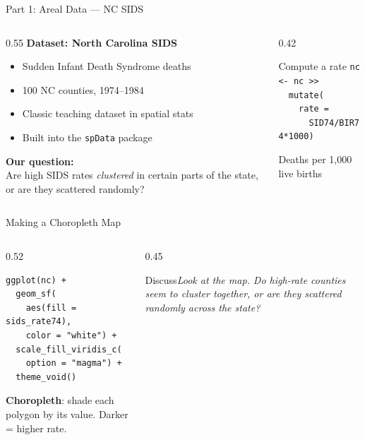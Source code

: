 \documentclass[aspectratio=169, 12pt]{beamer}
\newcommand{\pkg}[1]{\texttt{\color{spataccent}#1}}
\newcommand{\discuss}[1]{\begin{alertblock}{Discuss}\textit{#1}\end{alertblock}}
\begin{document}
\begin{frame}{Part 1: Areal Data --- NC SIDS}
  \begin{columns}[t]
    \begin{column}{0.55\textwidth}
      \textbf{Dataset: North Carolina SIDS}
      \begin{itemize}
        \item Sudden Infant Death Syndrome deaths
        \item 100 NC counties, 1974--1984
        \item Classic teaching dataset in spatial stats
        \item Built into the \pkg{spData} package
      \end{itemize}
      \vspace{0.6em}
      \textbf{Our question:}\\
      Are high SIDS rates \emph{clustered} in certain parts of the state, or are they scattered randomly?
    \end{column}
    \begin{column}{0.42\textwidth}
      \begin{exampleblock}{Compute a rate}
        \texttt{nc <- nc \textbar>\!\!\!>}\\
        \texttt{\ \ mutate(}\\
        \texttt{\ \ \ \ rate =}\\
        \texttt{\ \ \ \ \ \ SID74/BIR74*1000)}
        \vspace{0.3em}

        \small Deaths per 1,000 live births
      \end{exampleblock}
    \end{column}
  \end{columns}
\end{frame}
\begin{frame}[fragile]{Making a Choropleth Map}
  \begin{columns}[t]
    \begin{column}{0.52\textwidth}
\begin{lstlisting}
ggplot(nc) +
  geom_sf(
    aes(fill = sids_rate74),
    color = "white") +
  scale_fill_viridis_c(
    option = "magma") +
  theme_void()
\end{lstlisting}
      \vspace{0.4em}
      \small \textbf{Choropleth}: shade each polygon by its value. Darker = higher rate.
    \end{column}
    \begin{column}{0.45\textwidth}
      \discuss{Look at the map. Do high-rate counties seem to cluster together, or are they scattered randomly across the state?}
    \end{column}
  \end{columns}
\end{frame}
\end{document}
